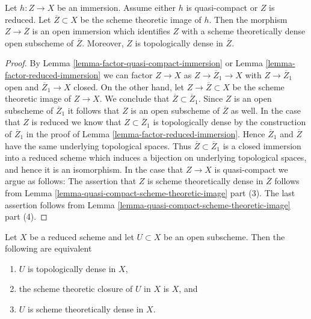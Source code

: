 \begin{lemma}
\label{lemma-quasi-compact-immersion}
Let $h : Z \to X$ be an immersion. Assume either $h$ is quasi-compact
or $Z$ is reduced. Let $\overline{Z} \subset X$ be the scheme theoretic
image of $h$. Then the morphism $Z \to \overline{Z}$ is an open immersion
which identifies $Z$ with a scheme theoretically dense open
subscheme of $\overline{Z}$. Moreover, $Z$ is topologically
dense in $\overline{Z}$.
\end{lemma}

\begin{proof}
By Lemma \ref{lemma-factor-quasi-compact-immersion} or
Lemma \ref{lemma-factor-reduced-immersion} we can factor
$Z \to X$ as $Z \to \overline{Z}_1 \to X$ with $Z \to \overline{Z}_1$
open and $\overline{Z}_1 \to X$ closed. On the other hand, let
$Z \to \overline{Z} \subset X$ be the scheme theoretic image of
$Z \to X$. We conclude that $\overline{Z} \subset \overline{Z}_1$.
Since $Z$ is an open subscheme of $\overline{Z}_1$ it follows
that $Z$ is an open subscheme of $\overline{Z}$ as well.
In the case that $Z$ is reduced we know that $Z \subset \overline{Z}_1$
is topologically dense by the construction of $\overline{Z}_1$ in
the proof of Lemma \ref{lemma-factor-reduced-immersion}.
Hence $\overline{Z}_1$ and $\overline{Z}$ have the same
underlying topological spaces. Thus $\overline{Z} \subset \overline{Z}_1$
is a closed immersion into a reduced scheme which induces a bijection
on underlying topological spaces, and hence it is an isomorphism.
In the case that $Z \to X$ is quasi-compact we argue as follows:
The assertion that $Z$ is scheme theoretically dense in
$\overline{Z}$ follows from
Lemma \ref{lemma-quasi-compact-scheme-theoretic-image} part (3).
The last assertion follows from
Lemma \ref{lemma-quasi-compact-scheme-theoretic-image} part (4).
\end{proof}

\begin{lemma}
\label{lemma-reduced-scheme-theoretically-dense}
Let $X$ be a reduced scheme and let $U \subset X$ be an open subscheme.
Then the following are equivalent
\begin{enumerate}
\item $U$ is topologically dense in $X$,
\item the scheme theoretic closure of $U$ in $X$ is $X$, and
\item $U$ is scheme theoretically dense in $X$.
\end{enumerate}
\end{lemma}

